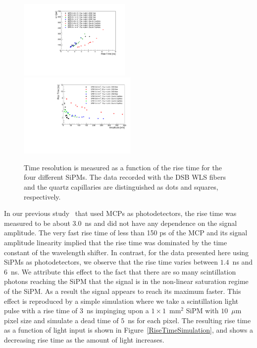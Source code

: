 \begin{figure}[!htb]
\centering
\includegraphics[width=0.48\textwidth]{figures/ShashlikTimeResolutionVsRiseTime.pdf}
\includegraphics[width=0.51\textwidth]{figures/ShashlikRiseTimeVsAmplitude.pdf}
\caption{\label{RiseTime}Time resolution is measured as a function of the rise time
for the four different SiPMs. The data recorded with the DSB WLS fibers and the
quartz capillaries are distinguished as dots and squares, respectively. }
\end{figure}

In our previous study~\cite{Anderson:2015gha} that used MCPs as photodetectors,
the rise time was measured to be about $3.0$~ns and did not have any dependence
on the signal amplitude. The very fast rise time of less than 150 ps of the MCP
and its signal amplitude linearity implied that the rise time was dominated by
the time constant of the wavelength shifter. In contrast, for the data presented
here using SiPMs as photodetectors, we observe that the rise time varies between
$1.4$~ns and $6$~ns. We attribute this effect to the fact that
there are so many scintillation photons reaching the SiPM that the signal is in
the non-linear saturation regime of the SiPM. As a result the signal appears to reach
its maximum faster. This effect is reproduced by a simple simulation where we 
take a scintillation light pulse with a rise time of $3$~ns impinging upon a
$1\times1$~$\mathrm{mm}^{2}$ SiPM with $10$~$\mu$m pixel size and 
simulate a dead time of $5$~ns for each pixel. The resulting rise time as a function
of light input is shown in Figure~\ref{RiseTimeSimulation}, and shows a 
decreasing rise time as the amount of light increases.

